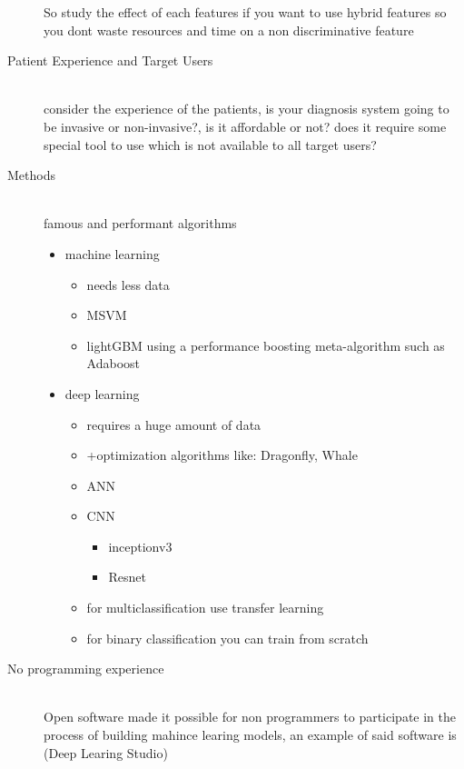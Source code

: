 \begin{description}
            So study the effect of each features if you want to use hybrid features so you dont waste resources and time on a non discriminative feature 
        \item[Patient Experience and Target Users] \hfill \\ 
            consider the experience of the patients,
            is your diagnosis system going to be invasive or non-invasive?, is it affordable or not? does it require some special tool to use which is not available to all target users?
        \item[Methods] \hfill \\
            famous and performant algorithms
            \begin{itemize}
            \item machine learning 
                \begin{itemize}
                    \item needs less data
                    \item MSVM
                    \item lightGBM using a performance boosting meta-algorithm such as Adaboost 
                \end{itemize}
            \item deep learning 
                \begin{itemize}
                    \item requires a huge amount of data
                    \item +optimization algorithms like: Dragonfly, Whale
                    \item ANN
                    \item CNN
                    \begin{itemize}
                        \item inceptionv3
                        \item Resnet
                    \end{itemize}
                    \item for multiclassification use transfer learning
                    \item for binary classification you can train from scratch
                \end{itemize}
            \end{itemize}
        \item[No programming experience] \hfill \\
            Open software made it possible for non programmers to participate in the process of building mahince learing models, an example of said software is (Deep Learing Studio)

\end{description}

